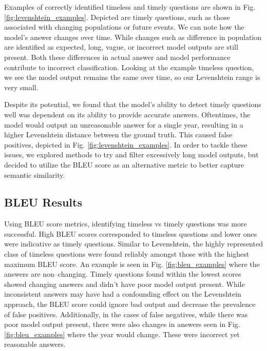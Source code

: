 \documentclass{article}
\begin{document}
Examples of correctly identified timeless and timely questions are shown in Fig.
\ref{fig:levenshtein_examples}. Depicted are timely questions, such as those
associated with changing populations or future events. We can note how the
model’s answer changes over time. While changes such as difference in population
are identified as expected, long, vague, or incorrect model outputs are still
present. Both these differences in actual answer and model performance
contribute to incorrect classification. Looking at the example timeless
question, we see the model output remains the same over time, so our Levenshtein
range is very small.

Despite its potential, we found that the model’s ability to detect timely
questions well was dependent on its ability to provide accurate answers.
Oftentimes, the model would output an unreasonable answer for a single year,
resulting in a higher Levenshtein distance between the ground truth. This caused
false positives, depicted in Fig. \ref{fig:levenshtein_examples}. In order to
tackle these issues, we explored methods to try and filter excessively long
model outputs, but decided to utilize the BLEU score as an alternative metric to
better capture semantic similarity.




\subsection{BLEU Results}
\label{bleu results}

Using BLEU score metrics, identifying timeless vs timely questions was more
successful. High BLEU scores corresponded to timeless questions and lower ones
were indicative as timely questions. Similar to Levenshtein, the highly
represented class of timeless questions were found reliably amongst those with
the highest maximum BLEU score. An example is seen in Fig.
\ref{fig:bleu_examples} where the answers are non--changing. Timely questions
found within the lowest scores showed changing answers and didn't have poor
model output present. While inconsistent answers may have had a confounding
effect on the Levenshtein approach, the BLEU score could ignore bad output and
decrease the prevalence of false positives. Additionally, in the cases of false
negatives, while there was poor model output present, there were also changes in
answers seen in Fig. \ref{fig:bleu_examples} where the year would change. These
were incorrect yet reasonable answers.
\end{document}
